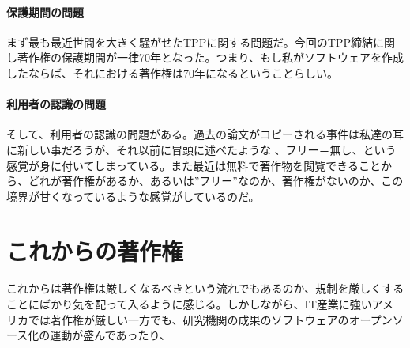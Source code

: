 \documentclass[a4j]{jsarticle}
\begin{document}
\subsection*{保護期間の問題}
まず最も最近世間を大きく騒がせたTPPに関する問題だ。今回のTPP締結に関し著作権の保護期間が一律70年となった。つまり、もし私がソフトウェアを作成したならば、それにおける著作権は70年になるということらしい。\cite{def-re}
\subsection*{利用者の認識の問題}
そして、利用者の認識の問題がある。過去の論文がコピーされる事件は私達の耳に新しい事だろうが、それ以前に冒頭に述べたような 、フリー＝無し、という感覚が身に付いてしまっている。また最近は無料で著作物を閲覧できることから、どれが著作権があるか、あるいは”フリー”なのか、著作権がないのか、この境界が甘くなっているような感覚がしているのだ。
\part{これからの著作権}
これからは著作権は厳しくなるべきという流れでもあるのか、規制を厳しくすることにばかり気を配って入るように感じる。しかしながら、IT産業に強いアメリカでは著作権が厳しい一方でも、研究機関の成果のソフトウェアのオープンソース化の運動が盛んであったり\cite{def_m_o}、



\end{document}
